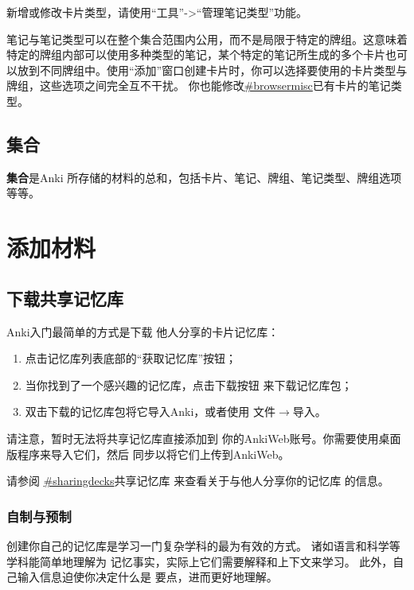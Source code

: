 \documentclass[a4paper]{book}
\begin{document}
新增或修改卡片类型，请使用“工具”->“管理笔记类型”功能。


\begin{shaded}
	笔记与笔记类型可以在整个集合范围内公用，而不是局限于特定的牌组。这意味着特定的牌组内部可以使用多种类型的笔记，某个特定的笔记所生成的多个卡片也可以放到不同牌组中。使用“添加”窗口创建卡片时，你可以选择要使用的卡片类型与牌组，这些选项之间完全互不干扰。 你也能修改\url{#browsermisc}已有卡片的笔记类型。
\end{shaded}
	
	\section{集合}
	
	\textbf{集合}是Anki 所存储的材料的总和，包括卡片、笔记、牌组、笔记类型、牌组选项等等。
	
	\chapter{添加材料}\label{}
	
	\section{下载共享记忆库}
	
	Anki入门最简单的方式是下载 他人分享的卡片记忆库：
	
	\begin{enumerate}
		\itemsep1pt\parskip0pt
		\item 点击记忆库列表底部的“获取记忆库”按钮；
		\item 当你找到了一个感兴趣的记忆库，点击下载按钮 来下载记忆库包；
		\item 双击下载的记忆库包将它导入Anki，或者使用 文件$\to$导入。
	\end{enumerate}
	
	请注意，暂时无法将共享记忆库直接添加到 你的AnkiWeb账号。你需要使用桌面版程序来导入它们，然后 同步以将它们上传到AnkiWeb。
	
	请参阅 \url{#sharingdecks}共享记忆库 来查看关于与他人分享你的记忆库 的信息。
	
	\subsection{自制与预制}
	
	创建你自己的记忆库是学习一门复杂学科的最为有效的方式。 诸如语言和科学等学科能简单地理解为 记忆事实，实际上它们需要解释和上下文来学习。 此外，自己输入信息迫使你决定什么是 要点，进而更好地理解。
	
\end{document}
